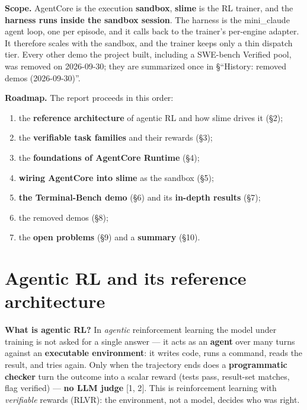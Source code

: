\documentclass[
  paper=a4,
  ,captions=tableheading
]{scrartcl}
\providecommand{\tightlist}{%
  \setlength{\itemsep}{0pt}\setlength{\parskip}{0pt}}
\begin{document}
\textbf{Scope.} AgentCore is the execution \textbf{sandbox},
\textbf{slime} is the RL trainer, and the \textbf{harness runs inside
the sandbox session}. The harness is the mini\_claude agent loop, one
per episode, and it calls back to the trainer's per-engine adapter. It
therefore scales with the sandbox, and the trainer keeps only a thin
dispatch tier. Every other demo the project built, including a SWE-bench
Verified pool, was removed on 2026-09-30; they are summarized once in
§``History: removed demos (2026-09-30)''.

\textbf{Roadmap.} The report proceeds in this order:

\begin{enumerate}
\def\labelenumi{\arabic{enumi}.}
\tightlist
\item
  the \textbf{reference architecture} of agentic RL and how slime drives
  it (§2);
\item
  the \textbf{verifiable task families} and their rewards (§3);
\item
  the \textbf{foundations of AgentCore Runtime} (§4);
\item
  \textbf{wiring AgentCore into slime} as the sandbox (§5);
\item
  \textbf{the Terminal-Bench demo} (§6) and its \textbf{in-depth
  results} (§7);
\item
  the removed demos (§8);
\item
  the \textbf{open problems} (§9) and a \textbf{summary} (§10).
\end{enumerate}

\hypertarget{agentic-rl-and-its-reference-architecture}{%
\section{Agentic RL and its reference
architecture}\label{agentic-rl-and-its-reference-architecture}}

\textbf{What is agentic RL?} In \emph{agentic} reinforcement learning
the model under training is not asked for a single answer --- it acts as
an \textbf{agent} over many turns against an \textbf{executable
environment}: it writes code, runs a command, reads the result, and
tries again. Only when the trajectory ends does a \textbf{programmatic
checker} turn the outcome into a scalar reward (tests pass, result-set
matches, flag verified) --- \textbf{no LLM judge} {[}1, 2{]}. This is
reinforcement learning with \emph{verifiable} rewards (RLVR): the
environment, not a model, decides who was right.
\end{document}
